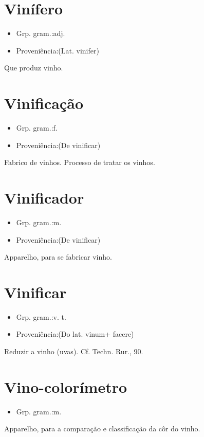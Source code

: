 \documentclass{article}
\begin{document}
\section{Vinífero}
\begin{itemize}
\item {Grp. gram.:adj.}
\end{itemize}
\begin{itemize}
\item {Proveniência:(Lat. \textunderscore vinifer\textunderscore )}
\end{itemize}
Que produz vinho.
\section{Vinificação}
\begin{itemize}
\item {Grp. gram.:f.}
\end{itemize}
\begin{itemize}
\item {Proveniência:(De \textunderscore vinificar\textunderscore )}
\end{itemize}
Fabrico de vinhos.
Processo de tratar os vinhos.
\section{Vinificador}
\begin{itemize}
\item {Grp. gram.:m.}
\end{itemize}
\begin{itemize}
\item {Proveniência:(De \textunderscore vinificar\textunderscore )}
\end{itemize}
Apparelho, para se fabricar vinho.
\section{Vinificar}
\begin{itemize}
\item {Grp. gram.:v. t.}
\end{itemize}
\begin{itemize}
\item {Proveniência:(Do lat. \textunderscore vinum\textunderscore  + \textunderscore facere\textunderscore )}
\end{itemize}
Reduzir a vinho (uvas). Cf. \textunderscore Techn. Rur.\textunderscore , 90.
\section{Vino-colorímetro}
\begin{itemize}
\item {Grp. gram.:m.}
\end{itemize}
Apparelho, para a comparação e classificação da côr do vinho.
\end{document}
